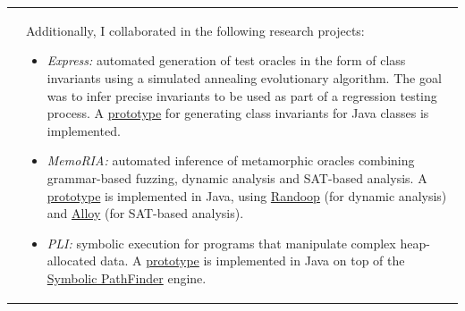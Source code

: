 \documentclass[a4paper,10pt]{article} %
\begin{document}
\begin{longtable}{>{\raggedleft\arraybackslash}p{} p{}}
& Additionally, I collaborated in the following research projects: 
\begin{itemize}
\setlength\itemsep{0.1em}
\item \textit{Express:} automated generation of test oracles in the form of class invariants using a simulated annealing evolutionary algorithm. The goal was to infer precise invariants to be used as part of a regression testing process. A \href{https://github.com/JuanmaCopia/express}{prototype} for generating class invariants for Java classes is implemented.
\item \textit{MemoRIA:} automated inference of metamorphic oracles combining grammar-based fuzzing, dynamic analysis and SAT-based analysis. A \href{https://zenodo.org/records/10683011}{prototype} is implemented in Java, using \href{https://randoop.github.io/randoop/}{Randoop} (for dynamic analysis) and \href{https://alloytools.org/}{Alloy} (for SAT-based analysis).
\item \textit{PLI:} symbolic execution for programs that manipulate complex heap-allocated data. A \href{https://github.com/JuanmaCopia/spf-pli}{prototype} is implemented in Java on top of the \href{https://github.com/SymbolicPathFinder/jpf-symbc}{Symbolic PathFinder} engine.

\end{itemize} \\ 


\end{longtable}
\end{document}
